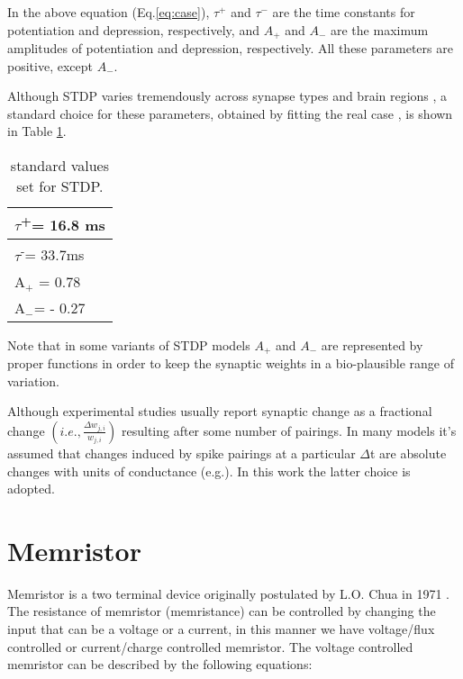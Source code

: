 \documentclass[review]{elsarticle}
\begin{document}
In the  above equation (Eq.\ref{eq:case}), $\tau^{+}$ and $\tau^{-}$ are the time constants for potentiation and depression, respectively, and $A_{+}$ and $A_{-}$ are the maximum amplitudes of potentiation and depression, respectively. All these parameters are positive, except $A_{-}$.


Although STDP varies tremendously across synapse types and brain regions \cite{Abbott2000}, a standard choice for these parameters, obtained by fitting the real case \cite{Viriyopase}, is shown in Table \ref{table:value}.



\begin{table}[]
\centering
\caption{standard values set for STDP.}
\label{table:value}
\begin{tabular}{|l|}
 \hline
$\tau$\textsuperscript{+}= 16.8 ms\\  \hline
$\tau$\textsuperscript{-}= 33.7ms  \\  \hline
A$_+$ = 0.78  \\  \hline
 A$_-$=  - 0.27   \\ \hline
 \end{tabular}
\end{table}

Note that in some variants of STDP models $A_{+}$ and $A_{-}$ are represented by proper functions in order to keep the synaptic weights in a bio-plausible range of variation. 

Although experimental studies usually report synaptic change as a fractional change $(i.e.,   \frac{\Delta w_{j,i}}{w_{j,i}})$ resulting after some number of pairings. In many models it's assumed that changes induced by spike pairings at a particular $\Delta$t are absolute changes with units of conductance (e.g.\cite{Farries2007}). In this work the latter choice is adopted.

\section{Memristor}
\label{mem}
Memristor is a two terminal device originally postulated by L.O. Chua in 1971 \cite{Chua1971}.
The resistance of memristor (memristance) can be controlled by changing the input that can be a voltage or a current, in this manner we have voltage/flux controlled or current/charge controlled memristor. The voltage controlled memristor can be described by the following equations:    \par
\end{document}
